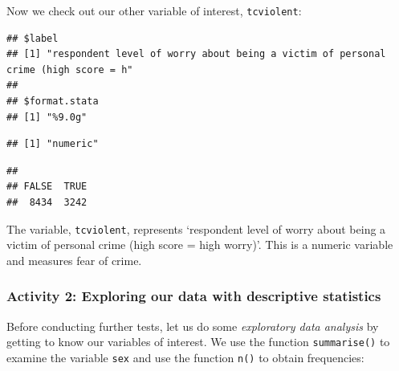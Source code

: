 \documentclass[
]{book}
\newenvironment{Shaded}{\begin{snugshade}}{\end{snugshade}}
\newcommand{\CommentTok}[1]{\textcolor[rgb]{0.56,0.35,0.01}{\textit{#1}}}
\newcommand{\FunctionTok}[1]{\textcolor[rgb]{0.00,0.00,0.00}{#1}}
\newcommand{\NormalTok}[1]{#1}
\newcommand{\SpecialCharTok}[1]{\textcolor[rgb]{0.00,0.00,0.00}{#1}}
\begin{document}
Now we check out our other variable of interest, \texttt{tcviolent}:

\begin{Shaded}
\end{Shaded}

\begin{verbatim}
## $label
## [1] "respondent level of worry about being a victim of personal crime (high score = h"
## 
## $format.stata
## [1] "%9.0g"
\end{verbatim}

\begin{Shaded}
\end{Shaded}

\begin{verbatim}
## [1] "numeric"
\end{verbatim}

\begin{Shaded}
\end{Shaded}

\begin{verbatim}
## 
## FALSE  TRUE 
##  8434  3242
\end{verbatim}

The variable, \texttt{tcviolent}, represents `respondent level of worry about being a victim of personal crime (high score = high worry)'. This is a numeric variable and measures fear of crime.

\hypertarget{activity-2-exploring-our-data-with-descriptive-statistics}{%
\subsubsection{Activity 2: Exploring our data with descriptive statistics}\label{activity-2-exploring-our-data-with-descriptive-statistics}}

Before conducting further tests, let us do some \emph{exploratory data analysis} by getting to know our variables of interest. We use the function \texttt{summarise()} to examine the variable \texttt{sex} and use the function \texttt{n()} to obtain frequencies:
\end{document}
